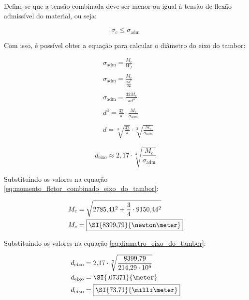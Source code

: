 Define-se que a tensão combinada deve ser menor ou igual à tensão de flexão admissível do material, ou seja:

\begin{equation*}
  \sigma_c \le \sigma_{\text{adm}}
\end{equation*}

Com isso, é possível obter a equação para calcular o diâmetro do eixo do tambor:

\begin{align*}
   & \sigma_{\text{adm}} = \frac{M_c}{W_f}                                        \\
   &                                                                              \\
   & \sigma_{\text{adm}} = \frac{M_c}{\frac{\pi d^3}{32}}                         \\
   &                                                                              \\
   & \sigma_{\text{adm}} = \frac{32 M_c}{\pi d^3}                                 \\
   &                                                                              \\
   & d^3 = \frac{32}{\pi} \cdot \frac{M_c}{\sigma_{\text{adm}}}                   \\
   &                                                                              \\
   & d = \sqrt[3]{\frac{32}{\pi}} \cdot \sqrt[3]{\frac{M_c}{\sigma_{\text{adm}}}}
\end{align*}

\begin{equation}
  d_{\text{eixo}} \approx 2{,}17 \cdot \sqrt[3]{\frac{M_c}{\sigma_{\text{adm}}}}
  \label{eq:diametro_eixo_do_tambor}
\end{equation}

\vspace{1em}

Substituindo os valores na equação \eqref{eq:momento_fletor_combinado_eixo_do_tambor}:

\begin{align*}
  M_c & = \sqrt{2785{,}41^2 + \frac{3}{4} \cdot 9150{,}44^2} \\
  M_c & = \boxed{\SI{8399{,}79}{\newton\meter}}
\end{align*}

Substituindo os valores na equação \eqref{eq:diametro_eixo_do_tambor}:

\begin{align*}
  d_{\text{eixo}} & = 2{,}17 \cdot \sqrt[3]{\frac{8399{,}79}{214{,}29 \cdot 10^6}} \\
  d_{\text{eixo}} & = \SI{{,}07371}{\meter}                                        \\
  d_{\text{eixo}} & = \boxed{\SI{73{,}71}{\milli\meter}}
\end{align*}
